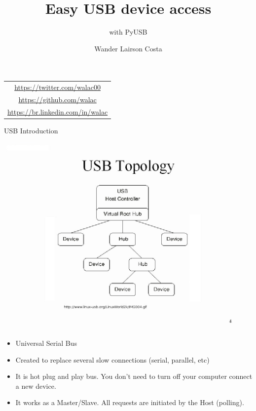 \documentclass[pdf]{beamer}
\title[PyUSB]{Easy USB device access}
\subtitle{with PyUSB}
\author{{\Large Wander Lairson Costa}}
\institute{{\large Mozilla Corporation}}
\date{}
\begin{document}
\begin{frame}
  \titlepage
  \begin{center}
    \begin{tabular}{c}
      \url{https://twitter.com/walac00} \\
      \url{https://github.com/walac} \\
      \url{https://br.linkedin.com/in/walac} \\
    \end{tabular}
  \end{center}
\end{frame}

\begin{frame}{USB Introduction}
  \begin{center}
    \includegraphics[scale=0.15]{img/topology.jpg}
  \end{center}
  \begin{itemize}
    \tiny
    \item Universal Serial Bus
    \item Created to replace several slow connections (serial, parallel, etc)
    \item It is hot plug and play bus. You don't need to turn off your computer
        connect a new device.
    \item It works as a Master/Slave. All requests are initiated by the Host (polling).
  \end{itemize}
\end{frame}
\end{document}
